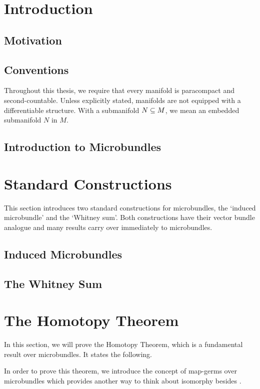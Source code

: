 \documentclass{article}
\begin{document}


\tableofcontents
\clearpage
\section{Introduction}\label{chapter::introduction}
\subsection*{Motivation}\label{section::motivation}

\subsection*{Conventions}
Throughout this thesis, we require that every manifold is paracompact and second-countable. Unless explicitly stated, manifolds are not equipped with a differentiable structure. With a submanifold $N \subseteq{} M$, we mean an embedded submanifold $N$ in $M$.
\subsection*{Introduction to Microbundles}\label{section::microbundle}

\section{Standard Constructions}\label{chapter::constructions}
\begin{myparagraph}
This section introduces two standard constructions for microbundles, the `induced microbundle' and the `Whitney sum'. Both constructions have their vector bundle analogue and many results carry over immediately to microbundles.
\end{myparagraph}
\subsection*{Induced Microbundles}\label{section::induced}

\subsection*{The Whitney Sum}\label{section::whitney}

\section{The Homotopy Theorem}\label{chapter::homotopy}
\begin{myparagraph}
In this section, we will prove the Homotopy Theorem, which is a fundamental result over microbundles. It states the following.
\end{myparagraph}

\begin{myparagraph}
In order to prove this theorem, we introduce the concept of map-germs over microbundles which provides another way to think about isomorphy besides .
\end{myparagraph}


\end{document}
